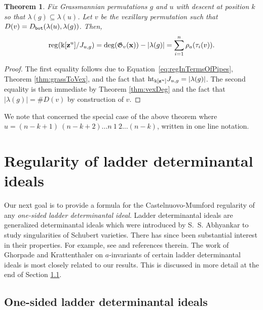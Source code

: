 \documentclass[12pt]{amsart}
\newtheorem{theorem}{Theorem}[section]
\theoremstyle{definition}
\theoremstyle{remark}
\numberwithin{equation}{section}
\newcommand{\maxexcited}{D_{\tt bot}}
\newcommand{\reg}{{\rm reg}}
\newcommand{\maxsizeantidiag}{\rho_a}
\begin{document}
\begin{theorem}\label{thm:KLSSCorrection}
Fix Grassmannian permutations $g$ and $u$ with descent at position $k$ so that $\lambda(g)\subseteq \lambda(u)$. Let $v$ be the vexillary permutation such that $D(v)=\maxexcited(\lambda(u),\lambda(g))$. 
 Then, \[\reg(\mathbb{\Bbbk}[{\bf z}^u]/J_{u,g})=\deg (\mathfrak{G}_v({\bf x})) - |\lambda(g)| = \sum_{i=1}^n \maxsizeantidiag(\tau_i(v)).\]
\end{theorem}
\begin{proof}
The first equality follows due to Equation~\eqref{eq:regInTermsOfPipes}, Theorem \ref{thm:grassToVex}, and the fact that $\text{ht}_{\Bbbk[{\bf z}^u]} J_{u,g} = |\lambda(g)|$. The second equality is then immediate by Theorem \ref{thm:vexDeg} and the fact that $|\lambda(g)| = \#D(v)$ by construction of $v$.
\end{proof}

We note that \cite[Conjecture 5.6]{RRRSW} concerned the special case of the above theorem where $u = (n-k+1)~(n-k+2)\dots n~1~2\dots (n-k)$, written in one line notation.





\section{Regularity of ladder determinantal ideals}\label{sec:regLad}

Our next goal is to provide a formula for the Castelnuovo-Mumford regularity of any \emph{one-sided ladder determinantal ideal}. Ladder determinantal ideals are generalized determinantal ideals which were introduced by S.~S. Abhyankar \cite{Abhyankar} to study singularities of Schubert varieties. There has since been substantial interest in their properties. For example, see \cite{Narasimhan, HT, Conca, Conca2, ConcaHerzog, GonLak, GM, KMY, Gorla, GMN, GK15} and references therein. The work of Ghorpade and Krattenthaler \cite{GK15} on $a$-invariants of certain ladder determinantal ideals is most closely related to our results. This is discussed in more detail at the end of Section \ref{sec:ladderBackground}.



\subsection{One-sided ladder determinantal ideals}\label{sec:ladderBackground}
\end{document}
